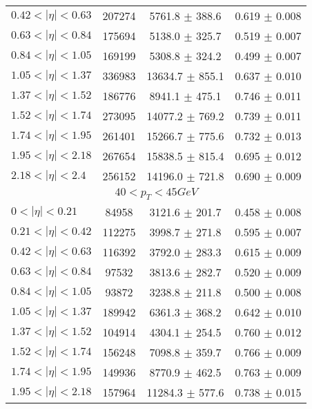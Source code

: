 \begin{tabular}{lccc}
$0.42 < |\eta| <0.63$          & 207274     & 5761.8     $\pm$ 388.6 & 0.619      $\pm$ 0.008 \\
$0.63 < |\eta| <0.84$          & 175694     & 5138.0     $\pm$ 325.7 & 0.519      $\pm$ 0.007 \\
$0.84 < |\eta| <1.05$          & 169199     & 5308.8     $\pm$ 324.2 & 0.499      $\pm$ 0.007 \\
$1.05 < |\eta| <1.37$          & 336983     & 13634.7    $\pm$ 855.1 & 0.637      $\pm$ 0.010 \\
$1.37 < |\eta| <1.52$          & 186776     & 8941.1     $\pm$ 475.1 & 0.746      $\pm$ 0.011 \\
$1.52 < |\eta| <1.74$          & 273095     & 14077.2    $\pm$ 769.2 & 0.739      $\pm$ 0.011 \\
$1.74 < |\eta| <1.95$          & 261401     & 15266.7    $\pm$ 775.6 & 0.732      $\pm$ 0.013 \\
$1.95 < |\eta| <2.18$          & 267654     & 15838.5    $\pm$ 815.4 & 0.695      $\pm$ 0.012 \\
$2.18 < |\eta| <2.4$           & 256152     & 14196.0    $\pm$ 721.8 & 0.690      $\pm$ 0.009 \\
\hline
\multicolumn{4}{c}{$40 < p_{T} < 45 GeV$} \\
\hline
$0 < |\eta| <0.21$             & 84958      & 3121.6     $\pm$ 201.7 & 0.458      $\pm$ 0.008 \\
$0.21 < |\eta| <0.42$          & 112275     & 3998.7     $\pm$ 271.8 & 0.595      $\pm$ 0.007 \\
$0.42 < |\eta| <0.63$          & 116392     & 3792.0     $\pm$ 283.3 & 0.615      $\pm$ 0.009 \\
$0.63 < |\eta| <0.84$          & 97532      & 3813.6     $\pm$ 282.7 & 0.520      $\pm$ 0.009 \\
$0.84 < |\eta| <1.05$          & 93872      & 3238.8     $\pm$ 211.8 & 0.500      $\pm$ 0.008 \\
$1.05 < |\eta| <1.37$          & 189942     & 6361.3     $\pm$ 368.2 & 0.642      $\pm$ 0.010 \\
$1.37 < |\eta| <1.52$          & 104914     & 4304.1     $\pm$ 254.5 & 0.760      $\pm$ 0.012 \\
$1.52 < |\eta| <1.74$          & 156248     & 7098.8     $\pm$ 359.7 & 0.766      $\pm$ 0.009 \\
$1.74 < |\eta| <1.95$          & 149936     & 8770.9     $\pm$ 462.5 & 0.763      $\pm$ 0.009 \\
$1.95 < |\eta| <2.18$          & 157964     & 11284.3    $\pm$ 577.6 & 0.738      $\pm$ 0.015 \\

\end{tabular}
